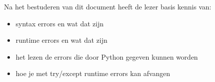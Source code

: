 Na het bestuderen van dit document heeft de lezer basis kennis van:
\begin{itemize}
\item syntax errors en wat dat zijn
\item runtime errors en wat dat zijn
\item het lezen de errors die door Python gegeven kunnen worden
\item hoe je met try/except runtime errors kan afvangen
\end{itemize}

